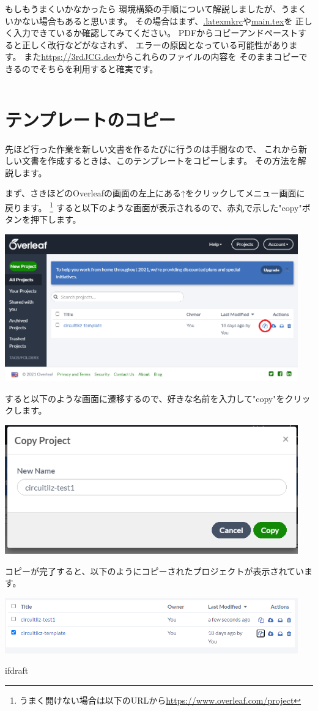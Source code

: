 		\begin{column}{もしもうまくいかなかったら}
			環境構築の手順について解説しましたが、うまくいかない場合もあると思います。
			その場合はまず、\url{.latexmkrc}や\url{main.tex}を
			正しく入力できているか確認してみてください。
			PDFからコピーアンドペーストすると正しく改行などがなされず、
			エラーの原因となっている可能性があります。
			また\url{https://3rdJCG.dev}からこれらのファイルの内容を
			そのままコピーできるのでそちらを利用すると確実です。
		\end{column}

	\section{テンプレートのコピー}
		先ほど行った作業を新しい文書を作るたびに行うのは手間なので、
		これから新しい文書を作成するときは、このテンプレートをコピーします。
		その方法を解説します。

		まず、さきほどのOverleafの画面の左上にある↑をクリックしてメニュー画面に戻ります。
		\footnote{うまく開けない場合は以下のURLから\url{https://www.overleaf.com/project}}
		すると以下のような画面が表示されるので、赤丸で示した"copy"ボタンを押下します。
		
		\includegraphics[width=0.95\textwidth]{overleaf-menu.png}
		
		すると以下のような画面に遷移するので、好きな名前を入力して"copy"をクリックします。

		\includegraphics[width=0.95\textwidth]{overleaf-menu-copy.png}

		コピーが完了すると、以下のようにコピーされたプロジェクトが表示されています。

		\includegraphics[width=0.95\textwidth]{overleaf-menu-copied.png}
		
		\expandafter\ifx\csname ifdraft\endcsname\relax

\fi